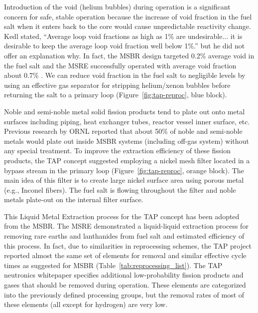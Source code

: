 Introduction of the void (helium bubbles) during operation is a significant 
concern for safe, stable operation because the increase of void fraction in 
the fuel salt when it enters back to the core would cause unpredictable 
reactivity change. Kedl stated, ``Average loop void fractions as high as 1\% 
are undesirable... it is desirable to keep the average loop void fraction well 
below 1\%.''\cite{robertson_conceptual_1971} but he did not offer an 
explanation why. In fact, the \gls{MSBR} design targeted 0.2\% average void in 
the fuel salt \cite{robertson_conceptual_1971} and the \gls{MSRE} successfully 
operated with average void fraction about 0.7\% \cite{compere_fission_1975}.
We can reduce void fraction in the fuel salt to negligible levels by using an 
effective gas separator for stripping helium/xenon bubbles before returning 
the salt to a primary loop (Figure~\ref{fig:tap-reproc}, blue block). 

Noble and semi-noble metal solid fission products tend to plate out onto metal 
surfaces including piping, heat exchanger tubes, reactor vessel inner surface, 
etc. Previous research by \gls{ORNL} \cite{robertson_conceptual_1971} reported 
that about 50\% of noble and semi-noble metals would plate out inside 
\gls{MSBR} systems (including off-gas system) without any special treatment. 
To improve the extraction efficiency of these fission products, the \gls{TAP} 
concept suggested employing a nickel mesh filter located in a bypass stream in 
the primary loop (Figure~\ref{fig:tap-reproc}, orange block). The main idea of 
this filter is to create large nickel surface area using porous metal (e.g., 
Inconel fibers). The fuel salt is flowing throughout the filter and noble 
metals plate-out on the internal filter surface. 

This Liquid Metal Extraction process for the \gls{TAP} concept has been 
adopted from the \gls{MSBR}. The \gls{MSRE} demonstrated a liquid-liquid 
extraction process for removing rare earths and lanthanides from fuel salt and 
estimated efficiency of this process. 
In fact, due to similarities in reprocessing schemes, the \gls{TAP} project 
reported almost the same set of elements for removal and similar effective 
cycle times as suggested for \gls{MSBR} (Table~\ref{tab:reprocessing_list}). 
The \gls{TAP} neutronics whitepaper specifies additional low-probability 
fission products and gases that should be removed during operation. These 
elements are categorized into the previously defined processing groups, but 
the removal rates of most of these elements (all except for hydrogen) 
are very low.

